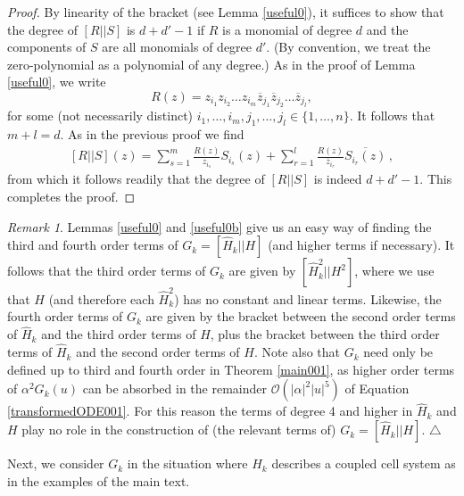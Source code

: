 \documentclass[12pt]{article}
\renewcommand{\mathcal}{\mathscr}
\theoremstyle{plain}
\theoremstyle{definition}
\theoremstyle{remark}
\newtheorem{remk}[thr]{Remark}
\theoremstyle{remark}
\begin{document}
\begin{proof}
By linearity of the bracket (see Lemma \ref{useful0}), it suffices to show that the degree of $[R||S]$ is $d+d'-1$ if $R$ is a monomial of degree $d$ and the components of $S$ are all monomials of degree $d'$. (By convention, we treat the zero-polynomial as a polynomial of any degree.) As in the proof of Lemma \ref{useful0}, we write
\[R(z) = z_{i_1}z_{i_2}\dots z_{i_m}\overline{z}_{j_1}\overline{z}_{j_2}\dots\overline{z}_{j_l} ,  \]
for some (not necessarily distinct) $i_1, \dots, i_m, j_1, \dots, j_l \in \{1, \dots, n\}$. It follows that $m+l = d$. As in the previous proof we find 
\begin{align}\label{needlaterrron12}
    [R||S](z) = \sum_{s=1}^m\frac{R(z)}{z_{i_s}}S_{i_s}(z) + \sum_{r=1}^l\frac{R(z)}{\overline{z}_{i_r}}\overline{S_{i_r}(z)}\, ,
\end{align}
from which it follows readily that the degree of $[R||S]$ is indeed $d+d'-1$. This completes the proof.
\end{proof}

\begin{remk}\label{remkaboutdegrees}
Lemmas \ref{useful0} and \ref{useful0b} give us an easy way of finding the third and fourth order terms of $G_k = [\widehat{H}_{k}||{H}]$ (and higher terms if necessary). It follows that the third order terms of $G_k$ are given by $[\widehat{H}^2_{k}||{H}^2]$, where we use that $H$ (and therefore each $\widehat{H}^2_{k}$) has no constant and linear terms. Likewise, the fourth order terms of $G_k$ are given by the bracket between the second order terms of $\widehat{H}_{k}$ and the third order terms of $H$, plus the bracket between the third order terms of $\widehat{H}_{k}$ and the second order terms of $H$. Note also that $G_k$ need only be defined up to third and fourth order in Theorem \ref{main001}, as higher order terms of $\alpha^2G_k(u)$ can be absorbed in the remainder $\mathcal{O}(|\alpha|^2|u|^5)$ of Equation \eqref{transformedODE001}. For this reason the terms of degree 4 and higher in $\widehat{H}_{k}$ and ${H}$ play no role in the construction of (the relevant terms of) $G_k = [\widehat{H}_{k}||{H}]$. \hfill $\triangle$
\end{remk}

Next, we consider $G_k$ in the situation where $H_k$ describes a coupled cell system as in the examples of the main text.
\end{document}
